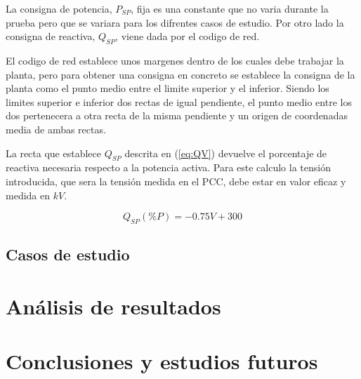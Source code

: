 \documentclass{book}
\begin{document}
La consigna de potencia, $P_{SP}$, fija es una constante que no varia durante la prueba pero que se variara para los difrentes casos de estudio. Por otro lado la consigna de reactiva, $Q_{SP}$, viene dada por el codigo de red. \par

El codigo de red establece unos margenes dentro de los cuales debe trabajar la planta, pero para obtener una consigna en concreto se establece la consigna de la planta como el punto medio entre el limite superior y el inferior. Siendo los limites superior e inferior dos rectas de igual pendiente, el punto medio entre los dos pertenecera a otra recta de la misma pendiente y un origen de coordenadas media de ambas rectas. \par

La recta que establece $Q_{SP}$ descrita en (\ref{eq:QV}) devuelve el porcentaje de reactiva necesaria respecto a la potencia activa. Para este calculo la tensi\'on introducida, que sera la tensi\'on medida en el PCC, debe estar en valor eficaz y medida en $kV$.  

\begin{equation}\label{eq:QV}
	Q_{SP}(\%P)= -0.75V +300 
\end{equation} \par

	\section{Casos de estudio}

\chapter{An\'alisis de resultados}


\chapter{Conclusiones y estudios futuros}



\end{document}
